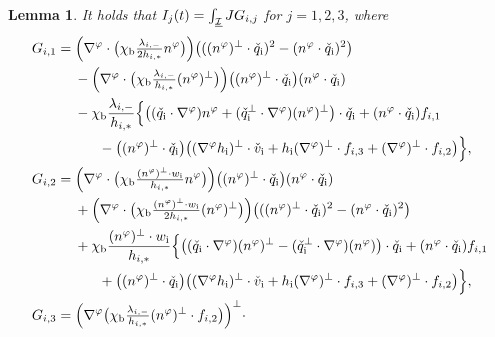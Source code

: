\documentclass[11pt]{article}
\newcommand{\cI}{{\mathcal I}}
\newcommand{\ul}[1]{\underline{#1}}
\newtheorem{lemma}[theorem]{Lemma}
\theoremstyle{definition}
\begin{document}
\begin{lemma}\label{lem:Rellich2}
It holds that $I_j(t)=\int_{\ul{\cI}}JG_{{\rm i},j}$ for $j=1,2,3$, where
\begin{align*}
G_{{\rm i},1}
&= \Bigl(\nabla^\varphi\cdot\bigl(\chi_\mathrm{b}\tfrac{\lambda_{{\rm i},-}}{2h_{{\rm i},*}}n^\varphi \bigr) \Bigr)
\bigl(((n^\varphi)^\perp\cdot\check{q}_\mathrm{i})^2 - (n^\varphi\cdot\check{q}_\mathrm{i})^2\bigr) \\
&\quad\;
- \Bigl(\nabla^\varphi\cdot\bigl(\chi_\mathrm{b}\tfrac{\lambda_{{\rm i},-}}{h_{{\rm i},*}}(n^\varphi)^\perp \bigr) \Bigr)
\bigl((n^\varphi)^\perp\cdot\check{q}_\mathrm{i}\bigr)(n^\varphi\cdot\check{q}_\mathrm{i}) \\
&\quad\;
- \chi_\mathrm{b}\frac{\lambda_{{\rm i},-}}{h_{{\rm i},*}}\Bigl\{
\bigl((\check{q}_\mathrm{i}\cdot\nabla^\varphi)n^\varphi + (\check{q}_\mathrm{i}^\perp\cdot\nabla^\varphi)(n^\varphi)^\perp \bigr)\cdot\check{q}_\mathrm{i}
+ (n^\varphi\cdot\check{q}_\mathrm{i})f_{{\rm i},1} \\
&\makebox[3em]{}
- \bigl((n^\varphi)^\perp\cdot\check{q}_\mathrm{i}\bigr)\bigl((\nabla^\varphi h_\mathrm{i})^\perp\cdot\check{v}_\mathrm{i} + h_\mathrm{i}(\nabla^\varphi)^\perp\cdot f_{{\rm i},3}
+ (\nabla^\varphi)^\perp\cdot f_{{\rm i},2}\bigr) \Bigr\}, \\
G_{{\rm i},2}
&= \Bigl(\nabla^\varphi\cdot\bigl(\chi_\mathrm{b}\tfrac{(n^\varphi)^\perp\cdot w_\mathrm{i}}{h_{{\rm i},*}}n^\varphi \bigr) \Bigr)
\bigl((n^\varphi)^\perp\cdot\check{q}_\mathrm{i}\bigr)(n^\varphi\cdot\check{q}_\mathrm{i}) \\
&\quad\;
+ \Bigl(\nabla^\varphi\cdot\bigl(\chi_\mathrm{b}\tfrac{(n^\varphi)^\perp\cdot w_\mathrm{i}}{2h_{{\rm i},*}}(n^\varphi)^\perp \bigr) \Bigr)
\bigl(((n^\varphi)^\perp\cdot\check{q}_\mathrm{i})^2 - (n^\varphi\cdot\check{q}_\mathrm{i})^2\bigr) \\
&\quad\;
+ \chi_\mathrm{b}\frac{(n^\varphi)^\perp\cdot w_\mathrm{i}}{h_{{\rm i},*}}\Bigl\{
\bigl((\check{q}_\mathrm{i}\cdot\nabla^\varphi)(n^\varphi)^\perp - (\check{q}_\mathrm{i}^\perp\cdot\nabla^\varphi)(n^\varphi) \bigr)\cdot\check{q}_\mathrm{i}
+ (n^\varphi\cdot\check{q}_\mathrm{i})f_{{\rm i},1} \\
&\makebox[3em]{}
+ \bigl((n^\varphi)^\perp\cdot\check{q}_\mathrm{i}\bigr)\bigl((\nabla^\varphi h_\mathrm{i})^\perp\cdot\check{v}_\mathrm{i} + h_\mathrm{i}(\nabla^\varphi)^\perp\cdot f_{{\rm i},3}
+ (\nabla^\varphi)^\perp\cdot f_{{\rm i},2}\bigl) \Bigr\}, \\
G_{{\rm i},3}
&= \Bigl(\nabla^\varphi\bigl(\chi_\mathrm{b}\tfrac{\lambda_{{\rm i},-}}{h_{{\rm i},*}}(n^\varphi)^\perp\cdot f_{{\rm i},2} \bigr) \Bigr)^\perp\cdot

\end{align*}
\end{lemma}
\end{document}
